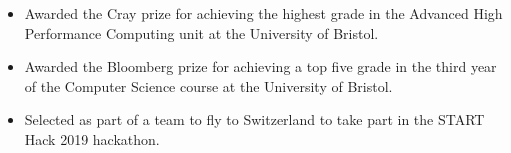 \vspace{-1.1em}


\begin{cvparagraph}

\begin{itemize}[leftmargin=*]
    \itemsep-0.6em
    \item {Awarded the Cray prize for achieving the highest grade in the Advanced High Performance Computing unit at the University of Bristol.}
    \item {Awarded the Bloomberg prize for achieving a top five grade in the third year of the Computer Science course at the University of Bristol.}
    \item {Selected as part of a team to fly to Switzerland to take part in the START Hack 2019 hackathon.}
\end{itemize}

\end{cvparagraph}